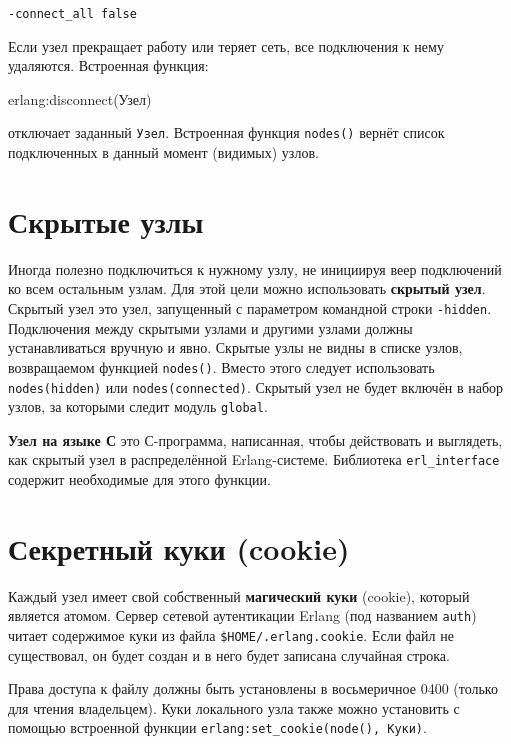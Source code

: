 \qquad\texttt{-connect\_all false}

Если узел прекращает работу или теряет сеть, все подключения к нему удаляются.
Встроенная функция:

\begin{erlangru}
erlang:disconnect(Узел)
\end{erlangru}

отключает заданный \texttt{Узел}. Встроенная функция \texttt{nodes()} вернёт 
список подключенных в данный момент (видимых) узлов.


\section{Скрытые узлы}

Иногда полезно подключиться к нужному узлу, не инициируя веер подключений ко всем
остальным узлам.  Для этой цели можно использовать \textbf{скрытый узел}. 
Скрытый узел это узел, запущенный с параметром командной строки \texttt{-hidden}. 
Подключения между скрытыми узлами и другими узлами должны устанавливаться вручную 
и явно.  Скрытые узлы не видны в списке узлов, возвращаемом функцией 
\texttt{nodes()}.  Вместо этого следует использовать \texttt{nodes(hidden)} или 
\texttt{nodes(connected)}.  Скрытый узел не будет включён в набор узлов, за 
которыми следит модуль \texttt{global}.

\textbf{Узел на языке С} это С-программа, написанная, чтобы действовать и 
выглядеть, как скрытый узел в распределённой Erlang-системе.  Библиотека 
\texttt{erl\_interface} содержит необходимые для этого функции.


\section{Секретный куки (cookie)}

Каждый узел имеет свой собственный \textbf{магический куки} (cookie), который 
является атомом. Сервер сетевой аутентикации Erlang (под названием \texttt{auth})
читает содержимое куки из файла \texttt{\$HOME/.erlang.cookie}.  Если файл не
существовал, он будет создан и в него будет записана случайная строка.


Права доступа к файлу должны быть установлены в восьмеричное 0400 (только для
чтения владельцем).  Куки локального узла также можно установить с помощью 
встроенной функции \texttt{erlang:set\_cookie(node(), Куки)}.

